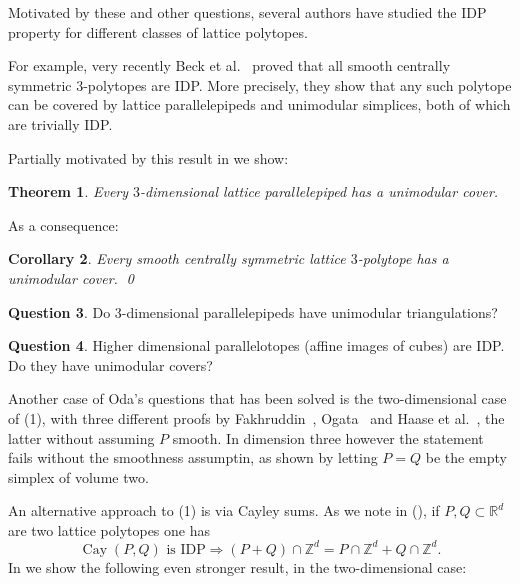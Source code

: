 \documentclass{amsart}
\theoremstyle{plain}
\newtheorem{theorem}{Theorem}[section]
\newtheorem{corollary}[theorem]{Corollary}
\theoremstyle{definition}
\newtheorem{question}[theorem]{Question}
\newcommand{\Z}{ \ensuremath{\mathbb{Z}}}
\newcommand{\R}{ \ensuremath{\mathbb{R}}}
\newcommand{\cayley}{\operatorname{Cay}}
\begin{document}
Motivated by these and other questions, several authors have studied the IDP property for different classes of lattice polytopes. 

For example,  very recently
Beck et al.~\cite{BHHHJKM2019} proved that all smooth centrally symmetric $3$-polytopes are IDP.
More precisely, they show that any such polytope can be covered by lattice 
parallelepipeds and unimodular simplices, both of which are trivially IDP.

Partially motivated by this result in  we show:

\begin{theorem}
\label{thm:parallelepipeds}
Every $3$-dimensional lattice parallelepiped has a unimodular cover.
\end{theorem}

As a consequence:

\begin{corollary}
\label{coro:3cs}
Every smooth centrally symmetric lattice $3$-polytope has a unimodular cover. 
\qed
\end{corollary}

\begin{question}
Do $3$-dimensional parallelepipeds have unimodular triangulations?
\end{question}

\begin{question}
Higher dimensional parallelotopes (affine images of cubes) are IDP. Do they have unimodular covers? 
\end{question}


Another case of Oda's questions that has been solved is the two-dimensional case of (1), with three different proofs by
Fakhruddin~\cite{Fakhruddin}, Ogata~\cite{Ogata} and Haase et al.~\cite{HNPS2008}, the latter without assuming $P$ smooth. 
In dimension three however the statement fails without the smoothness assumptin, as shown by letting $P=Q$ be the empty simplex of volume two.

An alternative approach to (1) is via Cayley sums. As we note in  (), if $P,Q\subset \R^d$ are two lattice polytopes one has
\[
\cayley(P,Q) \text{ is IDP} 
\Rightarrow
(P+Q) \cap \Z^d = P \cap \Z^d + Q \cap \Z^d.
\]
In  we show the following even stronger result, in the two-dimensional case:
\end{document}

